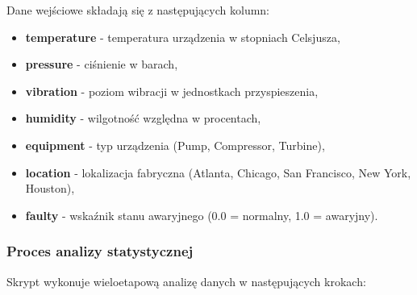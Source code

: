 Dane wejściowe składają się z następujących kolumn:
\begin{itemize}
    \item \textbf{temperature} - temperatura urządzenia w stopniach Celsjusza,
    \item \textbf{pressure} - ciśnienie w barach,
    \item \textbf{vibration} - poziom wibracji w jednostkach przyspieszenia,
    \item \textbf{humidity} - wilgotność względna w procentach,
    \item \textbf{equipment} - typ urządzenia (Pump, Compressor, Turbine),
    \item \textbf{location} - lokalizacja fabryczna (Atlanta, Chicago, San Francisco, New York, Houston),
    \item \textbf{faulty} - wskaźnik stanu awaryjnego (0.0 = normalny, 1.0 = awaryjny).
\end{itemize}

\subsubsection{Proces analizy statystycznej}

Skrypt wykonuje wieloetapową analizę danych w następujących krokach:

